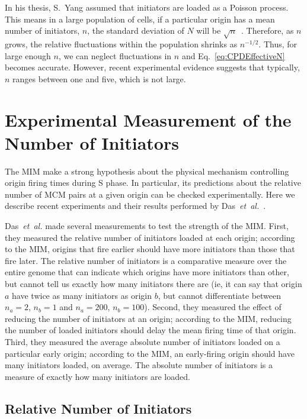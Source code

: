 {		In his thesis, S.~Yang assumed that initiators are loaded as a Poisson process.
		This means in a large population of cells, if a particular origin has a mean number of initiators, $n$, the standard deviation of $N$ will be $\sqrt{n}$~\cite{cowan}.
		Therefore, as $n$ grows, the relative fluctuations within the population shrinks as $n^{-1/2}$.
		Thus, for large enough $n$, we can neglect fluctuations in $n$ and Eq.~\ref{eq:CPDEffectiveN} becomes accurate.
		However, recent experimental evidence suggests that typically, $n$ ranges between one and five, which is not large.
		
	\section{Experimental Measurement of the Number of Initiators}
	\label{sec:ExperimentsMIM}
	
	The MIM make a strong hypothesis about the physical mechanism controlling origin firing times during S phase.
	In particular, its predictions about the relative number of MCM pairs at a given origin can be checked experimentally.
	Here we describe recent experiments and their results performed by Das~\emph{et~al.}~\cite{Rhind}.
	
	Das~\emph{et~al.} made several measurements to test the strength of the MIM.
	First, they measured the relative number of initiators loaded at each origin; according to the MIM, origins that fire earlier should have more initiators than those that fire later.
	The relative number of initiators is a comparative measure over the entire genome that can indicate which origins have more initiators than other, but cannot tell us exactly how many initiators there are (ie, it can say that origin $a$ have twice as many initiators as origin $b$, but cannot differentiate between $n_a=2$, $n_b=1$ and $n_a=200$, $n_b=100$).
	Second, they measured the effect of reducing the number of initiators at an origin; according to the MIM, reducing the number of loaded initiators should delay the mean firing time of that origin.
	Third, they measured the average absolute number of initiators loaded on a particular early origin; according to the MIM, an early-firing origin should have many initiators loaded, on average.
	The absolute number of initiators is a measure of exactly how many initiators are loaded.
	
		\subsection{Relative Number of Initiators}
		\label{subsec:RelativeNo}
		
}
